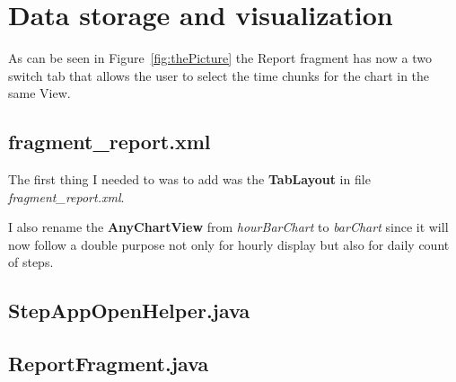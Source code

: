 \section{Data storage and visualization}
    
    As can be seen in Figure~\ref{fig:thePicture} the Report fragment has now a two switch tab
    that allows the user to select the time chunks for the chart in the same View.
    
\subsection{fragment\_report.xml}\label{subsec:fragment_report.xml}
        The first thing I needed to was to add was the \textbf{TabLayout} in file
        \textit{fragment\_report.xml}.

    
    
    I also rename the \textbf{AnyChartView} from \textit{hourBarChart} to \textit{barChart}
        since it will now follow a double purpose not only for hourly display but also for daily
        count of steps.
    
\subsection{StepAppOpenHelper.java}
    


\subsection{ReportFragment.java}




